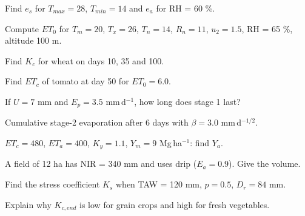 \begin{exlist}
\item Find $e_s$ for $T_{max}=28$, $T_{min}=14$ and $e_a$ for RH = 60 \%.
\item Compute $ET_0$ for $T_m=20$, $T_x=26$, $T_n=14$, $R_n=11$, $u_2=1.5$, RH = 65 \%, altitude 100 m.
\item Find $K_c$ for wheat on days 10, 35 and 100.
\item Find $ET_c$ of tomato at day 50 for $ET_0=6.0$.
\item If $U=7$ mm and $E_p=3.5$ mm\,d$^{-1}$, how long does stage 1 last?
\item Cumulative stage-2 evaporation after 6 days with $\beta=3.0$ mm\,d$^{-1/2}$.\exans{7.3 mm}
\item $ET_c=480$, $ET_a=400$, $K_y=1.1$, $Y_m=9$ Mg\,ha$^{-1}$: find $Y_a$.
\item A field of 12 ha has NIR = 340 mm and uses drip ($E_a=0.9$). Give the volume.
\item Find the stress coefficient $K_s$ when TAW = 120 mm, $p=0.5$, $D_r=84$ mm.
\item Explain why $K_{c,end}$ is low for grain crops and high for fresh vegetables.
\end{exlist}
